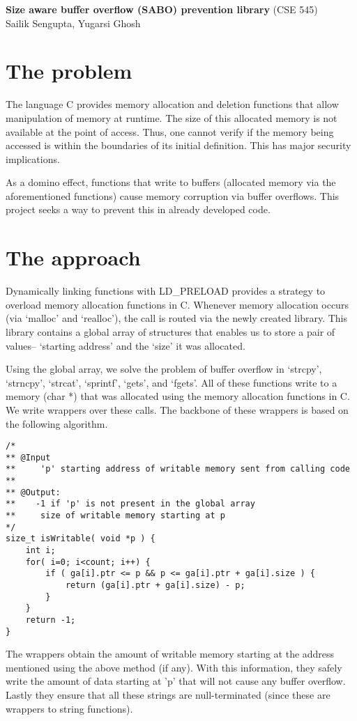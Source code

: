 \documentclass[a4paper, 11pt]{article}
\begin{document}
\noindent
\large\textbf{Size aware buffer overflow (SABO) prevention library} (\normalsize CSE 545)\\
Sailik Sengupta, Yugarsi Ghosh \\

\section{The problem}

The language C provides memory allocation and deletion functions that allow manipulation of memory at runtime. The size of this allocated memory is not available at the point of access. Thus, one cannot verify if the memory being accessed is within the boundaries of its initial definition.  This has major security implications.

As a domino effect, functions that write to buffers (allocated memory via the aforementioned functions) cause memory corruption via buffer overflows.  This project seeks a way to prevent this in already developed code.

\section{The approach}

Dynamically linking functions with LD\_PRELOAD provides a strategy to overload memory allocation functions in C. Whenever memory allocation occurs (via `malloc' and `realloc'), the call is routed via the newly created library.  This library contains a global array of structures that enables us to store a pair of values-- `starting address' and the `size' it was allocated.

Using the global array, we solve the problem of buffer overflow in `strcpy', `strncpy', `strcat', `sprintf', `gets', and `fgets'.  All of these functions write to a memory (char *) that was allocated using the memory allocation functions in C.  We write wrappers over these calls.  The backbone of these wrappers is based on the following algorithm.
\vspace{0.35em}
\lstset{language=C}
\begin{lstlisting}[frame=single]
/*
** @Input
**     'p' starting address of writable memory sent from calling code
**
** @Output:
**    -1 if 'p' is not present in the global array
**     size of writable memory starting at p 
*/
size_t isWritable( void *p ) {
    int i;
    for( i=0; i<count; i++) {
        if ( ga[i].ptr <= p && p <= ga[i].ptr + ga[i].size ) {
            return (ga[i].ptr + ga[i].size) - p;
        }
    }
    return -1;
}
\end{lstlisting}
\vspace{0.35em}
The wrappers obtain the amount of writable memory starting at the address mentioned using the above method (if any).  With this information, they safely write the amount of data starting at 'p' that will not cause any buffer overflow.  Lastly they ensure that all these strings are null-terminated (since these are wrappers to string functions).
\end{document}
